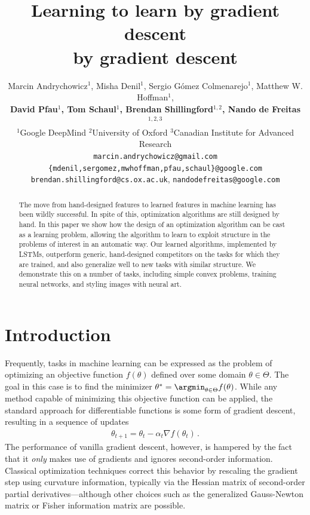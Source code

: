 \documentclass{article}
\title{Learning to learn by gradient descent\\\hspace{7.75em}by gradient descent}
\author{
Marcin Andrychowicz$^1$,
Misha Denil$^1$,
Sergio G\'omez Colmenarejo$^1$,
Matthew W. Hoffman$^1$,\\
\textbf{David Pfau$^1$,
Tom Schaul$^1$,
Brendan Shillingford$^{1,2}$,
Nando de Freitas$^{1,2,3}$}\\[0.5em]
$^1$Google DeepMind \quad $^2$University of Oxford \quad $^3$Canadian Institute for Advanced Research \\[0.5em]
\texttt{marcin.andrychowicz@gmail.com}\\
\texttt{\{mdenil,sergomez,mwhoffman,pfau,schaul\}@google.com}\\
\texttt{brendan.shillingford@cs.ox.ac.uk},
\texttt{nandodefreitas@google.com}
}
\begin{document}
\maketitle

\begin{abstract}
  The move from hand-designed features to learned features in machine learning
  has been wildly successful.  In spite of this, optimization algorithms are
  still designed by hand.  In this paper we show how the design of an
  optimization algorithm can be cast as a learning problem, allowing the
  algorithm to learn to exploit structure in the problems of interest in an
  automatic way.  Our learned algorithms, implemented by LSTMs, outperform
  generic, hand-designed competitors on the tasks for which they are trained,
  and also generalize well to new tasks with similar structure.  We demonstrate
  this on a number of tasks, including simple convex problems, training neural
  networks, and styling images with neural art.
\end{abstract}

\section{Introduction}

Frequently, tasks in machine learning can be expressed as the problem of
optimizing an objective function $f(\theta)$ defined over some domain
$\theta\in\Theta$. The goal in this case is to find the minimizer
$\theta^* =
\argmin_{\theta\in\Theta}f(\theta)$. While any method capable of minimizing
this objective function can be applied, the standard approach for
differentiable functions is some form of gradient descent, resulting in a
sequence of updates
\begin{align*}
  \theta_{t+1} = \theta_t - \alpha_t \nabla f(\theta_t)
  \,.
\end{align*}
The performance of vanilla gradient descent, however, is hampered by the fact
that it \emph{only} makes use of gradients and ignores second-order
information. Classical optimization techniques correct this behavior by
rescaling the gradient step using curvature information, typically via the
Hessian matrix of
second-order partial derivatives---although other choices such as the
generalized Gauss-Newton matrix or Fisher information matrix are possible.
\end{document}

